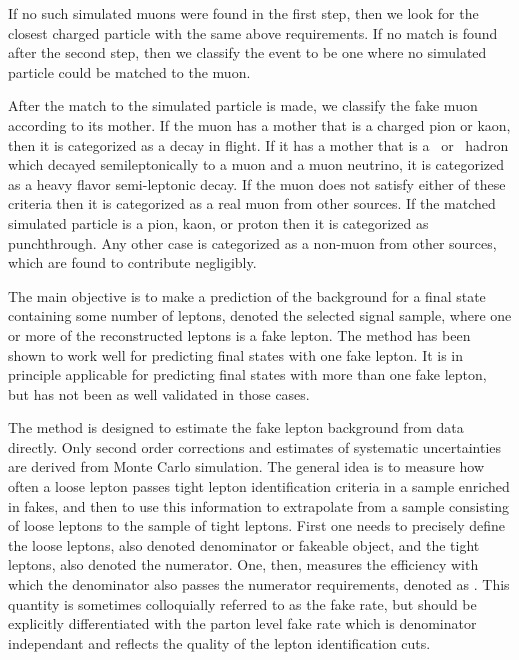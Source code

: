 \documentclass{cmspaper}
\begin{document}
If no such simulated muons were found in the first step, then we look for the closest charged particle with the same above requirements. If no match is found after the second step, then we classify the event to be one where no simulated particle could be matched to the muon.

After the match to the simulated particle is made, we classify the fake muon according to its mother. If the muon has a mother that is a charged pion or kaon, then it is categorized as a decay in flight. If it has a mother that is a \B\ or \D\ hadron which decayed semileptonically to a muon and a muon neutrino, it is categorized as a heavy flavor semi-leptonic decay. If the muon does not satisfy either of these criteria then it is categorized as a real muon from other sources. If the matched simulated particle is a pion, kaon, or proton then it is categorized as punchthrough. Any other case is categorized as a non-muon from other sources, which are found to contribute negligibly.

The main objective is to make a prediction of the background for a final state containing some number of leptons, denoted the selected signal sample, where one or more of the reconstructed leptons is a fake lepton. The method has been shown to work well for predicting final states with one fake lepton\cite{CDFTopDilepton}. It is in principle applicable for predicting final states with more than one fake lepton, but has not been as well validated in those cases.

The method is designed to estimate the fake lepton background from data directly. Only second order corrections and estimates of systematic uncertainties are derived from Monte Carlo simulation. The general idea is to measure how often a loose lepton passes tight lepton identification criteria in a sample enriched in fakes, and then to use this information to extrapolate from a sample consisting of loose leptons to the sample of tight leptons. First one needs to precisely define the loose leptons, also denoted denominator or fakeable object, and the tight leptons, also denoted the numerator. One, then, measures the efficiency with which the denominator also passes the numerator requirements, denoted as \epsilonFake. This quantity is sometimes colloquially referred to as the fake rate, but should be explicitly differentiated with the parton level fake rate which is denominator independant and reflects the quality of the lepton identification cuts. 
\end{document}
